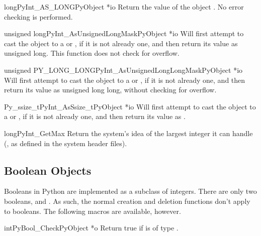 \begin{cfuncdesc}{long}{PyInt_AS_LONG}{PyObject *io}
  Return the value of the object .  No error checking is
  performed.
\end{cfuncdesc}

\begin{cfuncdesc}{unsigned long}{PyInt_AsUnsignedLongMask}{PyObject *io}
  Will first attempt to cast the object to a  or
  , if it is not already one, and then return its
  value as unsigned long.  This function does not check for overflow.
\end{cfuncdesc}

\begin{cfuncdesc}{unsigned PY_LONG_LONG}{PyInt_AsUnsignedLongLongMask}{PyObject *io}
  Will first attempt to cast the object to a  or
  , if it is not already one, and then return its
  value as unsigned long long, without checking for overflow.
\end{cfuncdesc}

\begin{cfuncdesc}{Py_ssize_t}{PyInt_AsSsize_t}{PyObject *io}
  Will first attempt to cast the object to a  or
  , if it is not already one, and then return its
  value as .
\end{cfuncdesc}

\begin{cfuncdesc}{long}{PyInt_GetMax}{}
  Return the system's idea of the largest integer it can handle
  (, as defined in the system
  header files).
\end{cfuncdesc}

\subsection{Boolean Objects \label{boolObjects}}

Booleans in Python are implemented as a subclass of integers.  There
are only two booleans,  and .  As
such, the normal creation and deletion functions don't apply to
booleans.  The following macros are available, however.

\begin{cfuncdesc}{int}{PyBool_Check}{PyObject *o}
  Return true if  is of type .
\end{cfuncdesc}

